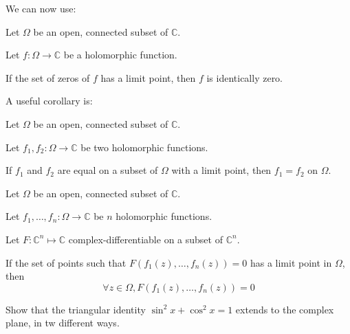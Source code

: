We can now use:

\begin{thm*}
    Let $\Omega$ be an open, connected subset of $\mathbb{C}$.

    Let $f: \Omega \rightarrow \mathbb{C}$ be a holomorphic function.
    
    If the set of zeros of $f$ has a limit point, then $f$ is identically zero.
\end{thm*}

A useful corollary is:

\begin{thm*}
    Let $\Omega$ be an open, connected subset of $\mathbb{C}$.

    Let $f_1, f_2: \Omega \rightarrow \mathbb{C}$ be two holomorphic functions.

    If $f_1$ and $f_2$ are equal on a subset of $\Omega$ with a limit point, then $f_1=f_2$ on $\Omega$.
\end{thm*}

\begin{thm*}
    Let $\Omega$ be an open, connected subset of $\mathbb{C}$.

    Let $f_1, \dots, f_n: \Omega \rightarrow \mathbb{C}$ be $n$ holomorphic functions.

    Let $F : \mathbb{C}^n \mapsto \mathbb{C}$ complex-differentiable on a subset of $\mathbb{C}^n$.

    If the set of points such that $F(f_1(z), \dots, f_n(z)) = 0$ has a limit point in $\Omega$, then $$\forall z\in\Omega, F(f_1(z), \dots, f_n(z))=0$$
\end{thm*}

\begin{exo}
    [$\star$]
    Show that the triangular identity $\sin^2 x + \cos^2 x = 1$ extends to the complex plane, in tw different ways.
\end{exo}






